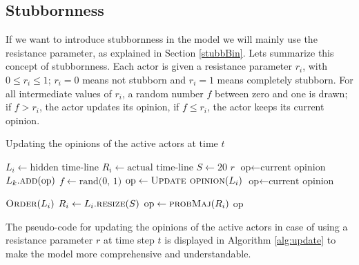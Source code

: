 \documentclass[11 pt , letterpaper , twoside , openright]{book}
\begin{document}
\subsection{Stubbornness}

If we want to introduce stubbornness in the model we will mainly use the resistance parameter, as explained in Section \ref{stubbBin}. Lets summarize this concept of stubbornness. Each actor is given a resistance parameter $r_i$, with $0 \leqslant r_i \leqslant 1$; $r_i = 0$ means not stubborn and $r_i = 1$ means completely stubborn. For all intermediate values of $r_i$, a random number $f$ between zero and one is drawn; if $f > r_i$, the actor updates its opinion, if $f \leqslant r_i$, the actor keeps its current opinion. 

\begin{algorithm}[H]
\caption{Updating the opinions of the active actors at time $t$}
\label{alg:update}
\begin{algorithmic}[1]
	\State \(L_i \leftarrow \text{hidden time-line}\)
	\State \(R_i \leftarrow \text{actual time-line}\)
	\State \(S \leftarrow 20\) 
	\State \(r\) 
		\State \(\text{op} \leftarrow \text{current opinion}\)
		 
			\State \(L_k.\textsc{add}\text{(op)}\)
		\EndFor
		\State \(f \leftarrow \text{rand(0, 1)}\) 
			\State \(\text{op} \leftarrow \Call{Update opinion}{L_i}\) 
		\Else
			\State \(\text{op} \leftarrow \text{current opinion}\) 
		\EndIf
	\EndFor
	
		\State \(\textsc{Order}(L_i)\) 
			\State \(R_i \leftarrow L_i.\textsc{resize}(S)\) 
		\EndIf
		\State \(\text{op} \leftarrow \textsc{probMaj}(R_i)\) 
	\State \Return op 
	\EndFunction
\end{algorithmic}
\end{algorithm}
\noindent
The pseudo-code for updating the opinions of the active actors in case of using a resistance parameter $r$ at time step $t$ is displayed in Algorithm \ref{alg:update} to make the model more comprehensive and understandable.
\end{document}
